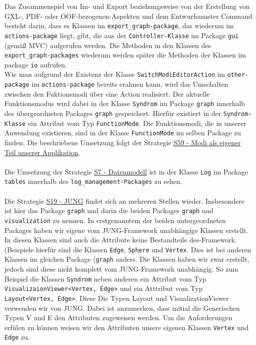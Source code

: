 \documentclass[enabledeprecatedfontcommands,fontsize=11pt,paper=a4,twoside]{scrartcl}
\begin{document}
Das Zusammenspiel von Im- und Export beziehungsweise von der Erstellung von GXL-, PDF- oder OOF-bezogenen-Aspekten und dem Entwurfsmuster Command besteht darin, dass es Klassen im \texttt{export\_graph-package}, das wiederum im \texttt{actions-package} liegt, gibt, die aus der \texttt{Controller-Klasse} im Package \texttt{gui} (gemäß MVC) aufgerufen werden. Die Methoden in den Klassen des \texttt{export\_graph-packages} wiederum werden später die Methoden der Klassen im package \texttt{io} aufrufen. \\

Wie man aufgrund der Existenz der Klasse \texttt{SwitchModiEditorAction} im \texttt{other-package} im \texttt{actions-package} bereits erahnen kann, wird das Umschalten zwischen den Fuktionsmodi über eine Action realisiert. Der aktuelle Funktionsmodus wird dabei in der Klasse \texttt{Syndrom} im Package \texttt{graph} innerhalb des übergeordneten Packages \texttt{graph} gespeichert. Hierfür existiert in der \texttt{Syndrom-Klasse} ein Attribut vom Typ \texttt{FunctionMode}. Die Funktionsmodi, die in unserer Anwendung existieren, sind in der Klasse \texttt{FunctionMode} im selben Package zu finden. Die beschriebene Umsetzung folgt der Strategie \hyperlink{uuu}{S59 - Modi als eigener Teil unserer Applikation}. \\ \\

Die Umsetzung der Strategie \hyperlink{aaa}{S7 - Datenmodell} ist in der Klasse \texttt{Log} im Package \texttt{tables} innerhalb des \texttt{log\_management-Packages} zu sehen. \\ \\

Die Strategie \hyperlink{eee}{S19 - JUNG} findet sich an mehreren Stellen wieder. Insbesondere ist hier das Package \texttt{graph} und darin die beiden Packages \texttt{graph} und \texttt{visualization} zu nennen. In erstgenanntem der beiden untergeordneten Packages haben wir eigene vom JUNG-Framework unabhängige Klassen erstellt. In diesen Klassen sind auch die Attribute keine Bestandteile des-Framework. (Beispiele hierfür sind die Klassen \texttt{Edge}, \texttt{Sphere} und \texttt{Vertex}. Dies ist bei anderen Klassen im gleichen Package (\texttt{graph} anders. Die Klassen haben wir zwar erstellt, jedoch sind diese nicht komplett vom JUNG-Framework unabhängig. So zum Beispiel die Klassen \texttt{Syndrom} neben anderen ein Attribut vom Typ \texttt{VisualizaionViewer<Vertex, Edge>} und ein Atttribut vom Typ \texttt{Layout<Vertex, Edge>}. Diese Die Typen Layout und VisualizationViewer verwenden wir von JUNG. Dabei ist anzumerken, dass initial die Generischen Typen V und E den Attributen zugeweisen werden. Um die Anforderungen erfülen zu können weisen wir den Attributen unsere eigenen Klassen \texttt{Vertex} und \texttt{Edge} zu. \\ \\
\end{document}
